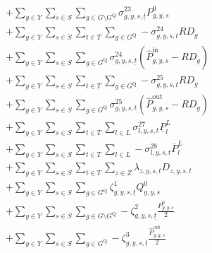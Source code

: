 \documentclass{article}
\newcommand{\sGenerators}{G}
\newcommand{\sStorage}{G^{\mathrm{Q}}}
\newcommand{\sYears}{Y}
\newcommand{\sScenarios}{S}
\newcommand{\sIntervals}{T}
\newcommand{\sZones}{Z}
\newcommand{\sLinks}{L}
\newcommand{\iGenerator}{g}
\newcommand{\iYear}{y}
\newcommand{\iScenario}{s}
\newcommand{\iInterval}{t}
\newcommand{\iIntervalStart}{\underline{\iInterval}}
\newcommand{\iZone}{z}
\newcommand{\iLink}{l}
\newcommand{\cRampRateDown}[1][\iGenerator]{RD_{#1}}
\newcommand{\cDemand}[1][\iZone,\iYear,\iScenario,\iInterval]{D_{#1}}
\newcommand{\cPowerFlowMin}{\underline{P}_{\iLink}^{L}}
\newcommand{\cPowerFlowMax}{\overline{P}_{\iLink}^{L}}
\newcommand{\cPowerInitial}[1][\iGenerator,\iYear,\iScenario]{P_{#1}^{0}}
\newcommand{\cPowerOutInitial}[1][\iGenerator,\iYear,\iScenario]{\hat{P}_{#1}^{\mathrm{out}}}
\newcommand{\cStorageEnergyInitial}[1][\iGenerator,\iYear,\iScenario]{Q_{#1}^{0}}
\newcommand{\cPowerInInitial}[1][\iGenerator,\iYear,\iScenario]{\hat{P}_{#1}^{\mathrm{in}}}
\newcommand{\dRampRateDown}[1][\iGenerator,\iYear,\iScenario,\iInterval]{\sigma_{#1}^{23}}
\newcommand{\dRampRateDownStorageCharging}[1][\iGenerator,\iYear,\iScenario,\iInterval]{\sigma_{#1}^{24}}
\newcommand{\dRampRateDownStorageDischarging}[1][\iGenerator,\iYear,\iScenario,\iInterval]{\sigma_{#1}^{25}}
\newcommand{\dMinPowerFlow}[1][\iLink,\iYear,\iScenario,\iInterval]{\sigma_{#1}^{27}}
\newcommand{\dMaxPowerFlow}[1][\iLink,\iYear,\iScenario,\iInterval]{\sigma_{#1}^{28}}
\newcommand{\dPowerBalance}[1][\iZone,\iYear,\iScenario,\iInterval]{\lambda_{#1}}
\newcommand{\dStorageEnergyTransition}[1][\iGenerator,\iYear,\iScenario,\iInterval]{\zeta_{#1}^{1}}
\newcommand{\dGeneratorEnergyOutput}[1][\iGenerator,\iYear,\iScenario,\iInterval]{\zeta_{#1}^{2}}
\newcommand{\dStorageEnergyOutput}[1][\iGenerator,\iYear,\iScenario,\iInterval]{\zeta_{#1}^{3}}
\begin{document}
\begin{align}
& + \sum\limits_{\iYear \in \sYears}\sum\limits_{\iScenario \in \sScenarios} \sum\limits_{\iGenerator \in \sGenerators \setminus \sStorage} \dRampRateDown[\iGenerator,\iYear,\iScenario,\iIntervalStart] \cPowerInitial\\
%
& + \sum\limits_{\iYear \in \sYears}\sum\limits_{\iScenario \in \sScenarios} \sum\limits_{\iInterval \in \sIntervals} \sum\limits_{\iGenerator \in \sStorage} - \dRampRateDownStorageCharging \cRampRateDown\\
& + \sum\limits_{\iYear \in \sYears}\sum\limits_{\iScenario \in \sScenarios} \sum\limits_{\iGenerator \in \sStorage} \dRampRateDownStorageCharging[\iGenerator,\iYear,\iScenario,\iIntervalStart] \left( \cPowerInInitial - \cRampRateDown \right)\\
%
& + \sum\limits_{\iYear \in \sYears}\sum\limits_{\iScenario \in \sScenarios} \sum\limits_{\iInterval \in \sIntervals} \sum\limits_{\iGenerator \in \sStorage} - \dRampRateDownStorageDischarging \cRampRateDown\\
& + \sum\limits_{\iYear \in \sYears}\sum\limits_{\iScenario \in \sScenarios} \sum\limits_{\iGenerator \in \sStorage} \dRampRateDownStorageDischarging[\iGenerator,\iYear,\iScenario,\iIntervalStart] \left( \cPowerOutInitial - \cRampRateDown \right)\\
%
& + \sum\limits_{\iYear \in \sYears}\sum\limits_{\iScenario \in \sScenarios}\sum\limits_{\iInterval \in \sIntervals} \sum\limits_{\iLink \in \sLinks} \dMinPowerFlow \cPowerFlowMin\\
& + \sum\limits_{\iYear \in \sYears}\sum\limits_{\iScenario \in \sScenarios}\sum\limits_{\iInterval \in \sIntervals} \sum\limits_{\iLink \in \sLinks} - \dMaxPowerFlow \cPowerFlowMax\\
& + \sum\limits_{\iYear \in \sYears}\sum\limits_{\iScenario \in \sScenarios}\sum\limits_{\iInterval \in \sIntervals} \sum\limits_{\iZone \in \sZones} \dPowerBalance \cDemand\\
& + \sum\limits_{\iYear \in \sYears}\sum\limits_{\iScenario \in \sScenarios}\sum\limits_{\iGenerator \in \sStorage} \dStorageEnergyTransition[\iGenerator,\iYear,\iScenario,\iIntervalStart] \cStorageEnergyInitial\\
& + \sum\limits_{\iYear \in \sYears}\sum\limits_{\iScenario \in \sScenarios}\sum\limits_{\iGenerator \in \sGenerators \setminus \sStorage} - \dGeneratorEnergyOutput[\iGenerator, \iYear,\iScenario,\iIntervalStart] \frac{\cPowerInitial}{2}\\
& + \sum\limits_{\iYear \in \sYears}\sum\limits_{\iScenario \in \sScenarios}\sum\limits_{\iGenerator \in \sStorage} - \dStorageEnergyOutput[\iGenerator, \iYear,\iScenario,\iIntervalStart] \frac{\cPowerOutInitial}{2}\\

\end{align}
\end{document}
